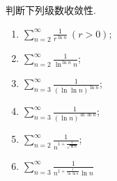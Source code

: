 \documentclass[../../main.tex]{subfiles}
\begin{document}
\begin{example}
判断下列级数收敛性.
\begin{enumerate}
\item $\sum_{n=2}^{\infty} \frac{1}{r^{\ln n}}\ (r > 0)$;

\item $\sum_{n=2}^{\infty} \frac{1}{\ln^{\ln n} n}$;

\item $\sum_{n=3}^{\infty} \frac{1}{(\ln \ln n)^{\ln n}}$;

\item $\sum_{n=3}^{\infty} \frac{1}{(\ln n)^{\ln \ln n}}$;

\item $\sum_{n=2}^{\infty} \frac{1}{n^{1 + \frac{1}{\sqrt{\ln n}}}}$;

\item $\sum_{n=3}^{\infty} \frac{1}{n^{1 + \frac{1}{\ln \ln n}} \ln n}$
\end{enumerate}
\end{example}
\end{document}
